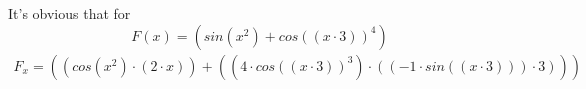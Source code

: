 \documentclass{article}
\begin{document}
\par It's obvious that for \[F(x) = \left(sin\left(x ^ {2}\right) + cos\left(\left(x \cdot 3\right)\right) ^ {4}\right)\]
\begin{gather*}
F_{x} = \left(\left(cos\left(x ^ {2}\right) \cdot \left(2 \cdot x\right)\right) + \left(\left(4 \cdot cos\left(\left(x \cdot 3\right)\right) ^ {3}\right) \cdot \left(\left(-1 \cdot sin\left(\left(x \cdot 3\right)\right)\right) \cdot 3\right)\right)\right)\\
\end{gather*}
\end{document}
